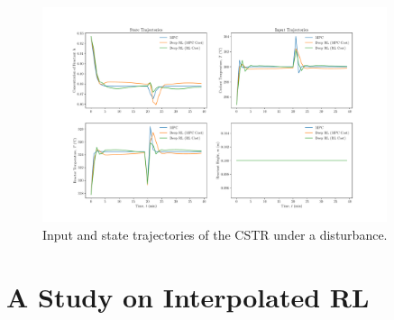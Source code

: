 \begin{figure}[H]
    \centering
    \includegraphics[width=0.9\textwidth]{images/ch4/States_and_Inputs_CSTR.pdf}
    \caption{Input and state trajectories of the CSTR under a disturbance.}
    \label{fig:04CSTR_Dis}
\end{figure}












\section{A Study on Interpolated RL}



